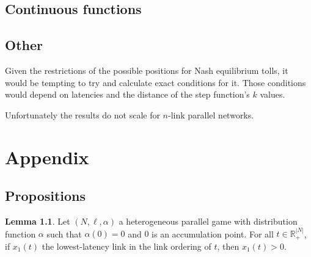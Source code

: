 \documentclass[10pt,a4paper]{book}
\newcommand{\R}{\mathbb{R}}
\theoremstyle{definition}
\newtheorem{lemma}[definition]{Lemma}
\theoremstyle{comment}
\begin{document}
\section*{Continuous functions}


\section*{Other}

Given the restrictions of the possible positions for Nash equilibrium tolls, it would be tempting to try and calculate exact conditions for it.
Those conditions would depend on latencies and the distance of the step function's $k$ values.

Unfortunately the results do not scale for $n$-link parallel networks.

\cleardoublepage

{}


\cleardoublepage

{}
\chapter{Appendix}
\label{chapter:appendix}

\section*{Propositions}

\begin{lemma}
	\label{lemma:a_0_accumulation_point}
	Let $(N, \ell, \alpha)$ a heterogeneous parallel game with distribution function $\alpha$ such that $\alpha(0) = 0$ and $0$ is an accumulation point.
	For all $t \in \R_+^{|N|}$, if $x_1(t)$ the lowest-latency link in the link ordering of $t$, then $x_1(t) > 0$.
\end{lemma}
\end{document}
